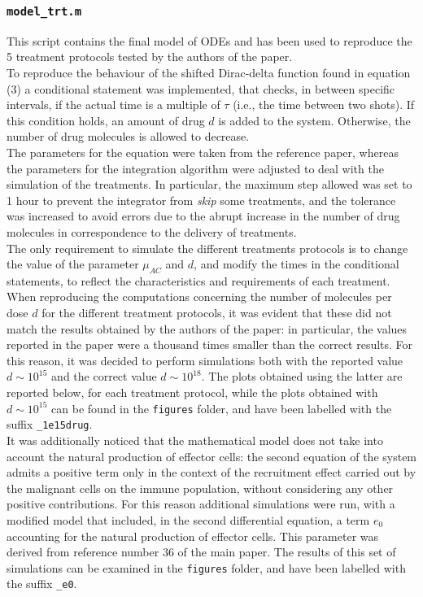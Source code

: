 \subsubsection{\texttt{model\_trt.m}}
This script contains the final model of ODEs and has been used to reproduce the 5 treatment protocols tested by the authors of the paper. \\
To reproduce the behaviour of the shifted Dirac-delta function found in equation (3) a conditional statement was implemented, that checks, in between specific intervals, if the actual time is a multiple of $\tau$ (i.e., the time between two shots). If this condition holds, an amount of drug $d$ is added to the system. Otherwise, the number of drug molecules is allowed to decrease.\\
The parameters for the equation were taken from the reference paper, whereas the parameters for the integration algorithm were adjusted to deal with the simulation of the treatments. In particular, the maximum step allowed was set to 1 hour to prevent the integrator from \textit{skip} some treatments, and the tolerance was increased to avoid errors due to the abrupt increase in the number of drug molecules in correspondence to the delivery of treatments.\\
The only requirement to simulate the different treatments protocols is to change the value of the parameter $\mu_{AC}$ and $d$, and modify the times in the conditional statements, to reflect the characteristics and requirements of each treatment. \\
When reproducing the computations concerning the number of molecules per dose $d$ for the different treatment protocols, it was evident that these did not match the results obtained by the authors of the paper: in particular, the values reported in the paper were a thousand times smaller than the correct results. For this reason, it was decided to perform simulations both with the reported value $d \sim 10^{15}$ and the correct value $d \sim 10^{18}$. The plots obtained using the latter are reported below, for each treatment protocol, while the plots obtained with $d \sim 10^{15}$ can be found in the \texttt{figures} folder, and have been labelled with the suffix \texttt{\_1e15drug}. \\
It was additionally noticed that the mathematical model does not take into account the natural production of effector cells: the second equation of the system admits a positive term only in the context of the recruitment effect carried out by the malignant cells on the immune population, without considering any other positive contributions. For this reason additional simulations were run, with a modified model that included, in the second differential equation, a term $e_0$ accounting for the natural production of effector cells. This parameter was derived from reference number 36 of the main paper. The results of this set of simulations can be examined in the \texttt{figures} folder, and have been labelled with the suffix \texttt{\_e0}.\\

